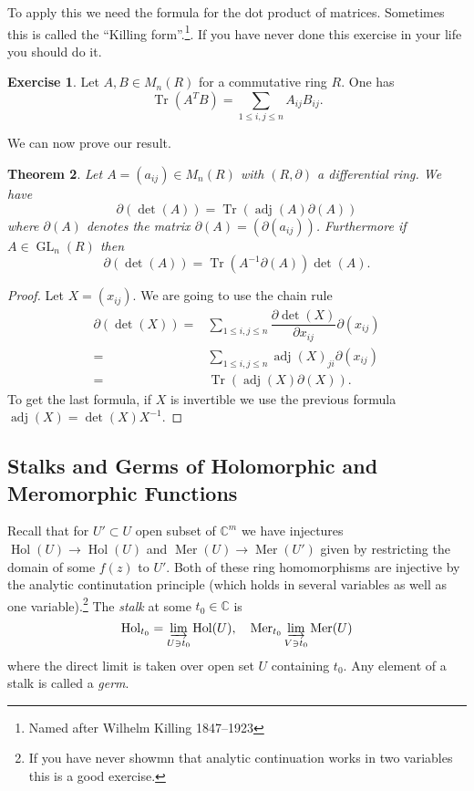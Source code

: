\documentclass[12pt]{book}
\numberwithin{equation}{section}
\newtheorem{theorem}{Theorem}[subsection]
\theoremstyle{definition}
\newtheorem{exercise}[theorem]{Exercise}
\theoremstyle{remark}
\newcommand{\CC}{\mathbb{C}}
\newcommand{\hol}{\operatorname{Hol}}
\newcommand{\Mer}{\operatorname{Mer}}
\newcommand{\adj}{\operatorname{adj}}
\newcommand{\GL}{\operatorname{GL}}
\newcommand{\Tr}{\operatorname{Tr}}
\begin{document}
To apply this we need the formula for the dot product of matrices. 
Sometimes this is called the ``Killing form''.\footnote{Named after Wilhelm Killing 1847--1923}.
If you have never done this exercise in your life you should do it.
\begin{exercise}
	Let $A,B \in M_n(R)$ for a commutative ring $R$. 
	One has 
	$$\Tr(A^TB) = \sum_{1\leq i,j \leq n}A_{ij}B_{ij}.$$ 
\end{exercise}
We can now prove our result.
\begin{theorem}
	Let $A = (a_{ij}) \in M_n(R)$ with $(R,\partial)$ a differential ring. 
	We have 
	 $$ \partial(\det(A)) = \Tr(\adj(A) \partial(A))$$
	where $\partial(A)$ denotes the matrix $\partial(A)= ( \partial(a_{ij}))$.
	Furthermore if $A \in \GL_n(R)$ then 
	 $$\partial(\det(A)) = \Tr( A^{-1} \partial(A)) \det(A).$$
\end{theorem}
\begin{proof}
	Let $X = (x_{ij})$.
	We are going to use the chain rule
	\begin{align*}
		\partial(\det(X)) =& \sum_{1\leq i,j \leq n} \dfrac{\partial \det(X)}{\partial x_{ij}}\partial(x_{ij}) \\
		=& \sum_{1\leq i,j \leq n} \adj(X)_{ji} \partial(x_{ij}) \\
		=& \Tr( \adj(X)\partial(X)).
	\end{align*}
    To get the last formula, if $X$ is invertible we use the previous formula $\adj(X) = \det(X) X^{-1}$.
\end{proof}


\subsection{Stalks and Germs of Holomorphic and Meromorphic Functions}

Recall that for $U' \subset U$ open subset of $\CC^m$ we have injectures $\hol(U) \to \hol(U)$ and $\Mer(U) \to \Mer(U')$ given by restricting the domain of some $f(z)$ to $U'$.
Both of these ring homomorphisms are injective by the analytic continutation principle (which holds in several variables as well as one variable).\footnote{If you have never showmn that analytic continuation works in two variables this is a good exercise.}
The \emph{stalk} at some $t_0 \in \CC$ is 
 $$ \hol_{t_0} = \varinjlim_{U \owns t_0} \hol(U), \quad \Mer_{t_0} \varinjlim_{V \owns t_0} \Mer(U) $$
where the direct limit is taken over open set $U$ containing $t_0$.
Any element of a stalk is called a \emph{germ}. 
\end{document}
